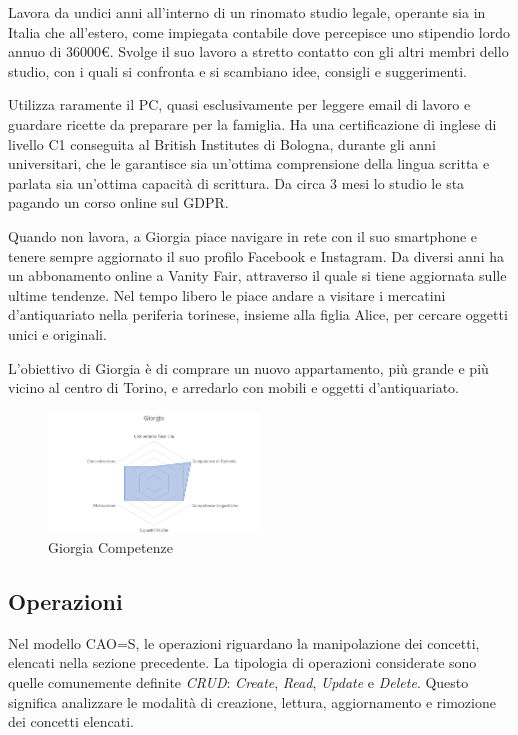 \documentclass[12pt,italian,]{report}
\begin{document}
Lavora da undici anni all'interno di un rinomato studio legale, operante
sia in Italia che all'estero, come impiegata contabile dove percepisce
uno stipendio lordo annuo di 36000€. Svolge il suo lavoro a stretto
contatto con gli altri membri dello studio, con i quali si confronta e
si scambiano idee, consigli e suggerimenti.

Utilizza raramente il PC, quasi esclusivamente per leggere email di
lavoro e guardare ricette da preparare per la famiglia. Ha una
certificazione di inglese di livello C1 conseguita al British Institutes
di Bologna, durante gli anni universitari, che le garantisce sia
un'ottima comprensione della lingua scritta e parlata sia un'ottima
capacità di scrittura. Da circa 3 mesi lo studio le sta pagando un corso
online sul GDPR.

Quando non lavora, a Giorgia piace navigare in rete con il suo
smartphone e tenere sempre aggiornato il suo profilo Facebook e
Instagram. Da diversi anni ha un abbonamento online a Vanity Fair,
attraverso il quale si tiene aggiornata sulle ultime tendenze. Nel tempo
libero le piace andare a visitare i mercatini d'antiquariato nella
periferia torinese, insieme alla figlia Alice, per cercare oggetti unici
e originali.

L'obiettivo di Giorgia è di comprare un nuovo appartamento, più grande e
più vicino al centro di Torino, e arredarlo con mobili e oggetti
d'antiquariato.

\begin{figure}[h]
\centering
\includegraphics[width=0.5\textwidth,height=\textheight]{img/giorgia_competenze.png}
\caption{Giorgia Competenze}
\end{figure}

\hypertarget{operazioni}{%
\subsection{Operazioni}\label{operazioni}}

Nel modello CAO=S, le operazioni riguardano la manipolazione dei
concetti, elencati nella sezione precedente. La tipologia di operazioni
considerate sono quelle comunemente definite \emph{CRUD}: \emph{Create},
\emph{Read}, \emph{Update} e \emph{Delete}. Questo significa analizzare
le modalità di creazione, lettura, aggiornamento e rimozione dei
concetti elencati.
\end{document}

